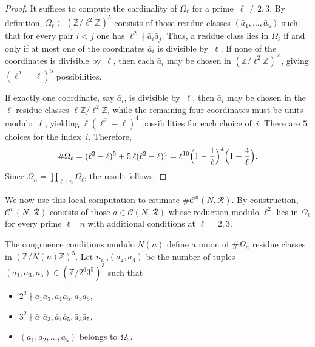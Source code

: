 \documentclass[table]{amsart}
\newcommand{\Z}{\mathbb{Z}}
\numberwithin{equation}{section}
\begin{document}
\begin{proof}It suffices to compute the cardinality of $\Omega_\ell$ for a prime~$\ell\neq 2,3$.
By definition, $\Omega_\ell \subset (\mathbb{Z}/\ell^2\mathbb{Z})^5$
consists of those residue classes $(\bar a_1,\dots,\bar a_5)$ such that
for every pair $i<j$ one has $\ell^2 \nmid \bar a_i \bar a_j$. Thus, a residue class lies in $\Omega_\ell$ if and only if
at most one of the coordinates $\bar a_i$ is divisible by~$\ell$. If none of the coordinates is divisible by~$\ell$, then each
$\bar a_i$ may be chosen in $(\mathbb{Z}/\ell^2\mathbb{Z})^\times$,
giving $(\ell^2-\ell)^5$ possibilities.

If exactly one coordinate, say $\bar a_i$, is divisible by~$\ell$,
then $\bar a_i$ may be chosen in the $\ell$ residue classes
$\ell\mathbb{Z}/\ell^2\mathbb{Z}$, while the remaining four coordinates
must be units modulo~$\ell$, yielding
$\ell(\ell^2-\ell)^4$ possibilities for each choice of~$i$.
There are $5$ choices for the index~$i$. Therefore,
\[
\#\Omega_\ell
=
(\ell^2-\ell)^5
+
5\,\ell(\ell^2-\ell)^4
=
\ell^{10}\Bigl(1-\frac{1}{\ell}\Bigr)^4
\Bigl(1+\frac{4}{\ell}\Bigr).
\]
\noindent Since $\Omega_n=\prod_{\ell\mid n}\Omega_\ell$, the result follows.
\end{proof} We now use this local computation to estimate
$\#\mathcal{C}^n(N, \mathscr{R})$.
By construction, $\mathcal{C}^n(N, \mathscr{R})$ consists of those
$a\in\mathcal{C}(N, \mathscr{R})$ whose reduction modulo $\ell^2$ lies in
$\Omega_\ell$ for every prime $\ell\mid n$ with additional conditions at $\ell=2,3$.

The congruence conditions modulo $N(n)$ define a union of
$\#\Omega_n$ residue classes in $(\mathbb{Z}/N(n)\mathbb{Z})^5$. Let $n_{i,j}(a_2, a_4)$ be the number of tuples $(\bar{a}_1, \bar{a}_3, \bar{a}_5)\in (\Z/2^{6}3^{5})^3$ such that
\begin{itemize}
    \item $2^2\nmid \bar{a}_1\bar{a}_3, \bar{a}_1\bar{a}_5, \bar{a}_3\bar{a}_5$,
    \item $3^2\nmid \bar{a}_1\bar{a}_3, \bar{a}_1\bar{a}_5, \bar{a}_3\bar{a}_5$,
    \item $(\bar{a}_1, \bar{a}_2, \dots, \bar{a}_5)$ belongs to $\Omega_6$.
\end{itemize}
\end{document}
